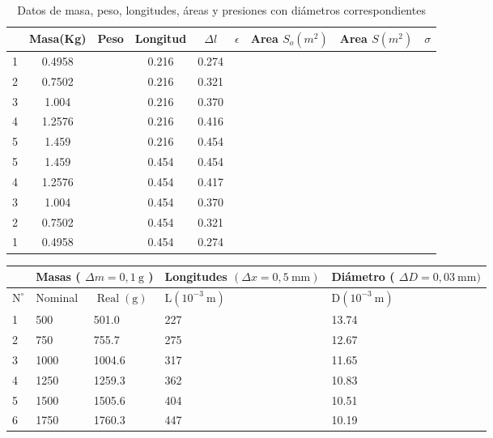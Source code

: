 \begin{table}[H]
\centering
\begin{tabular}{|c|c|c|c|c|c|c|c|c|}
\hline
   & Masa(Kg) &  Peso & Longitud & $\Delta l$ & $\epsilon$ & Area $S_o (m^2)$  & Area $S (m^2)$ & $\sigma$ \\ \hline 
  1 & 0.4958 &  & 0.216 & 0.274 &  &  &  &    \\ \hline 
  2 & 0.7502 &  & 0.216 & 0.321 &  &  &  &    \\ \hline
  3 & 1.004 &  & 0.216 & 0.370 &  &  &  &    \\ \hline 
  4 & 1.2576 &  & 0.216 & 0.416 &  &  &  &    \\ \hline 
  5 & 1.459 &  & 0.216 & 0.454 &  &  &  &    \\ \hline
  5 & 1.459 &  & 0.454 & 0.454 &  &  &  &    \\ \hline 
  4 & 1.2576 &  & 0.454 & 0.417 &  &  &  &    \\ \hline 
  3 & 1.004 &  & 0.454 & 0.370 &  &  &  &    \\ \hline 
  2 & 0.7502 &  & 0.454 & 0.321 &  &  &  &    \\ \hline 
  1 & 0.4958 &  & 0.454 & 0.274 &  &  &  &    \\ \hline
\end{tabular}
\caption{Datos de masa, peso, longitudes, áreas y presiones con diámetros correspondientes}
\label{tab:datos}
\end{table}

\begin{center}
\begin{tabular}{|l|l|l|l|l|}
\hline
 & \multicolumn{2}{|r|}{Masas ( $\Delta m=0,1 \mathrm{~g}$ )} & Longitudes $(\Delta x=0,5 \mathrm{~mm})$ & Diámetro ( $\Delta D=0,03 \mathrm{~mm})$ \\
\hline
$\mathrm{N}^{\circ}$ & Nominal & $\operatorname{Real}(\mathrm{g})$ & $\mathrm{L}\left(10^{-3} \mathrm{~m}\right)$ & $\mathrm{D}\left(10^{-3} \mathrm{~m}\right)$ \\
\hline
1 & 500 & 501.0 & 227 & 13.74 \\
\hline
2 & 750 & 755.7 & 275 & 12.67 \\
\hline
3 & 1000 & 1004.6 & 317 & 11.65 \\
\hline
4 & 1250 & 1259.3 & 362 & 10.83 \\
\hline
5 & 1500 & 1505.6 & 404 & 10.51 \\
\hline
6 & 1750 & 1760.3 & 447 & 10.19 \\
\hline
\end{tabular}
\end{center}

